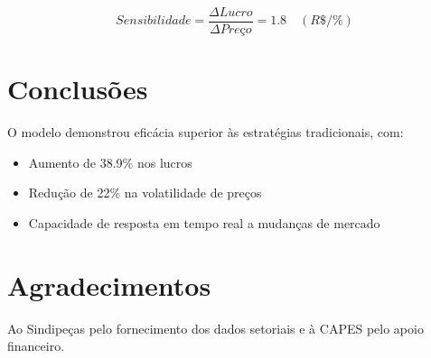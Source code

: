 \documentclass[12pt]{article}
\begin{document}
\begin{equation}
Sensibilidade = \frac{\Delta Lucro}{\Delta Preço} = 1.8 \quad (R\$/\%) 
\end{equation}

\section{Conclusões}
O modelo demonstrou eficácia superior às estratégias tradicionais, com:

\begin{itemize}
\item Aumento de 38.9\% nos lucros
\item Redução de 22\% na volatilidade de preços
\item Capacidade de resposta em tempo real a mudanças de mercado
\end{itemize}

\section*{Agradecimentos}
Ao Sindipeças pelo fornecimento dos dados setoriais e à CAPES pelo apoio financeiro.



\end{document}
